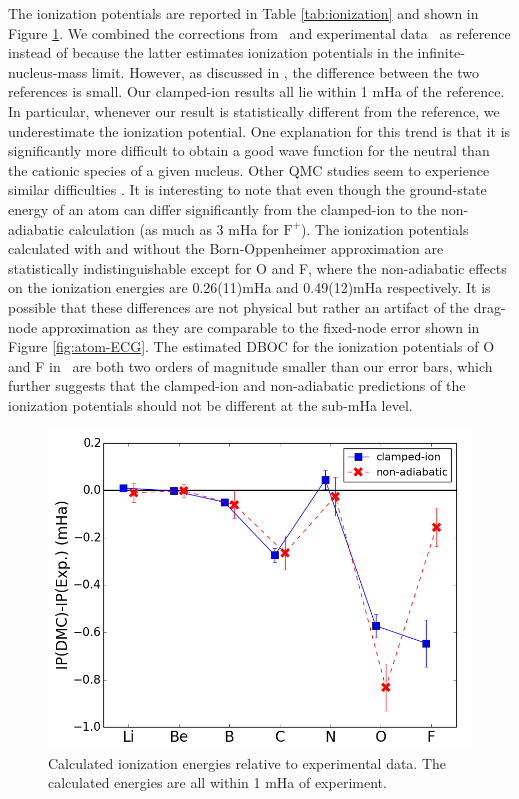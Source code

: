 \documentclass[pra,superscriptaddress,groupedaddress,twocolumn]{revtex4}
\begin{document}
The ionization potentials are reported in Table \ref{tab:ionization} and shown in Figure \ref{fig:ionization}. We combined the corrections from~\cite{Klopper_IP} and experimental data~\cite{NIST_Atoms} as reference instead of \cite{Davidson_Atoms} because the latter estimates ionization potentials in the infinite-nucleus-mass limit. However, as discussed in \cite{Seth_Bench}, the difference between the two references is small. Our clamped-ion results all lie within 1 mHa of the reference. In particular, whenever our result is statistically different from the reference, we underestimate the ionization potential. One explanation for this trend is that it is significantly more difficult to obtain a good wave function for the neutral than the cationic species of a given nucleus. Other QMC studies seem to experience similar difficulties \cite{Seth_Bench,Booth_FCIQMC,Brown_Bench}. It is interesting to note that even though the ground-state energy of an atom can differ significantly from the clamped-ion to the non-adiabatic calculation (as much as 3 mHa for $\text{F}^+$). The ionization potentials calculated with and without the Born-Oppenheimer approximation are statistically indistinguishable except for O and F, where the non-adiabatic effects on the ionization energies are 0.26(11)mHa and 0.49(12)mHa respectively. It is possible that these differences are not physical but rather an artifact of the drag-node approximation as they are comparable to the fixed-node error shown in Figure \ref{fig:atom-ECG}. The estimated DBOC for the ionization potentials of O and F in~\cite{Klopper_IP} are both two orders of magnitude smaller than our error bars, which further suggests that the clamped-ion and non-adiabatic predictions of the ionization potentials should not be different at the sub-mHa level.

\begin{figure}
\centering
\includegraphics[scale=.4]{Figures/ionization}
\caption{Calculated ionization energies relative to experimental data. The calculated energies are all within 1 mHa of experiment. \label{fig:ionization}}
\end{figure}
\end{document}
